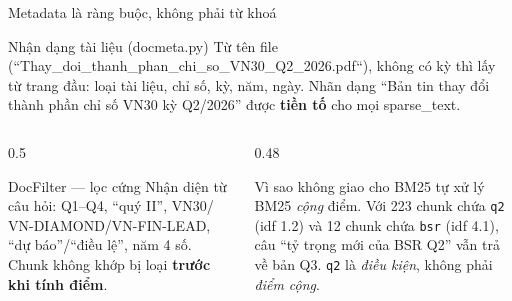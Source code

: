 \documentclass[aspectratio=169,11pt]{beamer}
\newcommand{\src}[1]{{\footnotesize\ttfamily #1}}
\begin{document}
\begin{frame}{Metadata là ràng buộc, không phải từ khoá}
  \begin{block}{\small Nhận dạng tài liệu (\src{docmeta.py})}
    Từ tên file (``Thay\_doi\_thanh\_phan\_chi\_so\_VN30\_Q2\_2026.pdf``), không
    có kỳ thì lấy từ trang đầu: loại tài liệu, chỉ số, kỳ, năm, ngày.
    Nhãn dạng ``Bản tin thay đổi thành phần chỉ số VN30 kỳ Q2/2026'' được
    \textbf{tiền tố} cho mọi \src{sparse\_text}.
  \end{block}
  \vspace{0.2em}
  \begin{columns}[T]
    \begin{column}{0.5\textwidth}
      \begin{block}{\small \src{DocFilter} — lọc cứng}
        Nhận diện từ câu hỏi: \src{Q1}--\src{Q4}, ``quý II'', \src{VN30}/
        \src{VN-DIAMOND}/\src{VN-FIN-LEAD}, ``dự báo''/``điều lệ'', năm 4 số.
        Chunk không khớp bị loại \textbf{trước khi tính điểm}.
      \end{block}
    \end{column}
    \begin{column}{0.48\textwidth}
      \begin{alertblock}{\small Vì sao không giao cho BM25 tự xử lý}
        BM25 \emph{cộng} điểm. Với 223 chunk chứa \texttt{q2} (idf 1.2) và 12 chunk
        chứa \texttt{bsr} (idf 4.1), câu ``tỷ trọng mới của BSR Q2'' vẫn trả về
        bản Q3. \texttt{q2} là \emph{điều kiện}, không phải \emph{điểm cộng}.
      \end{alertblock}
    \end{column}
  \end{columns}
\end{frame}
\end{document}
